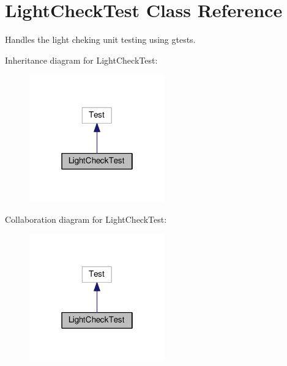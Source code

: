 \hypertarget{classLightCheckTest}{\section{Light\-Check\-Test Class Reference}
\label{classLightCheckTest}
}


Handles the light cheking unit testing using gtests.  




Inheritance diagram for Light\-Check\-Test\-:
\nopagebreak
\begin{figure}[H]
\begin{center}
\leavevmode
\includegraphics[width=166pt]{classLightCheckTest__inherit__graph}
\end{center}
\end{figure}


Collaboration diagram for Light\-Check\-Test\-:
\nopagebreak
\begin{figure}[H]
\begin{center}
\leavevmode
\includegraphics[width=166pt]{classLightCheckTest__coll__graph}
\end{center}
\end{figure}
